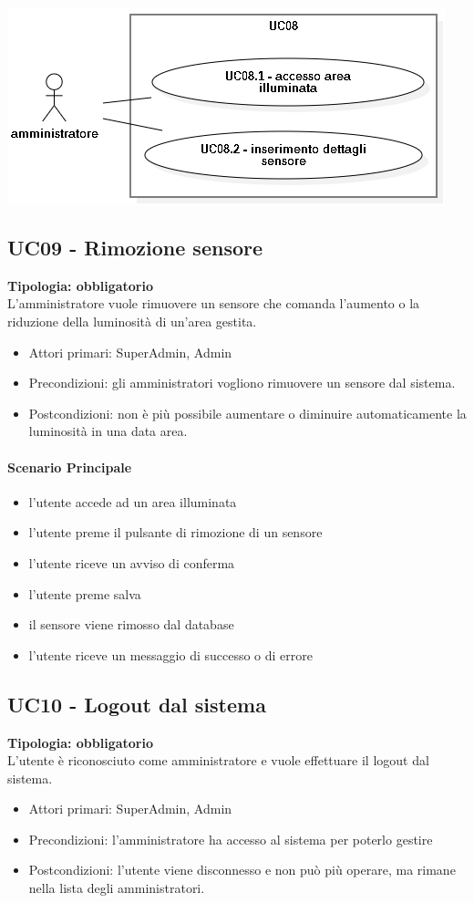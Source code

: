 \documentclass[12pt]{article}
\begin{document}
\includegraphics[scale=0.5]{UC08.png}

\subsection{UC09 - Rimozione sensore}
\textbf{Tipologia: obbligatorio}\\
L'amministratore vuole rimuovere un sensore che comanda l'aumento o la riduzione della luminosità di un'area gestita.
\begin{itemize}
	\item Attori primari: SuperAdmin, Admin
	\item Precondizioni: gli amministratori vogliono rimuovere un sensore dal sistema.
	\item Postcondizioni: non è più possibile aumentare o diminuire automaticamente la luminosità in una data area.
\end{itemize}
\paragraph{Scenario Principale}
\begin{itemize}
	\item l'utente accede ad un area illuminata
	\item l'utente preme il pulsante di rimozione di un sensore
	\item l'utente riceve un avviso di conferma
	\item l'utente preme salva
	\item il sensore viene rimosso dal database
	\item l'utente riceve un messaggio di successo o di errore
\end{itemize}


\subsection{UC10 - Logout dal sistema}
\textbf{Tipologia: obbligatorio} \\
L'utente è riconosciuto come amministratore e vuole effettuare il logout dal sistema.
\begin{itemize}
	\item Attori primari: SuperAdmin, Admin
	\item Precondizioni: l'amministratore ha accesso al sistema per poterlo gestire
	\item Postcondizioni: l'utente viene disconnesso e non può più operare, ma rimane nella lista degli amministratori.
\end{itemize}
\end{document}
